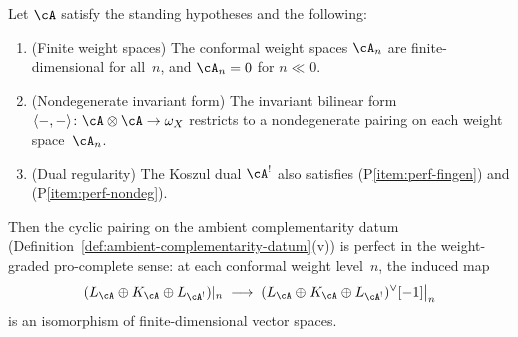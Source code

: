 \begin{proposition}
\label{prop:lagrangian-perfectness}
\ClaimStatusProvedHere
{}
Let $\cA$ satisfy the standing hypotheses and the following:
\begin{enumerate}[label=\textup{(P\arabic*)}]
\item\label{item:perf-fingen}
 \textup{(Finite weight spaces)}\quad
 The conformal weight spaces $\cA_n$ are finite-dimensional for
 all~$n$, and $\cA_n = 0$ for $n \ll 0$.
\item\label{item:perf-nondeg}
 \textup{(Nondegenerate invariant form)}\quad
 The invariant bilinear form
 $\langle{-},{-}\rangle \colon \cA \otimes \cA \to \omega_X$
 restricts to a nondegenerate pairing on each weight space~$\cA_n$.
\item\label{item:perf-dual}
 \textup{(Dual regularity)}\quad
 The Koszul dual $\cA^!$ also satisfies
 \textup{(P\ref{item:perf-fingen})} and
 \textup{(P\ref{item:perf-nondeg})}.
\end{enumerate}
Then the cyclic pairing on the ambient complementarity datum
\textup{(}Definition~\textup{\ref{def:ambient-complementarity-datum}(v))}
is perfect in the weight-graded pro-complete sense: at each conformal
weight level~$n$, the induced map
\[
(L_\cA \oplus K_\cA \oplus L_{\cA^!})|_n
\;\longrightarrow\;
(L_\cA \oplus K_\cA \oplus L_{\cA^!})^\vee[-1]\big|_n
\]
is an isomorphism of finite-dimensional vector spaces.
\end{proposition}

